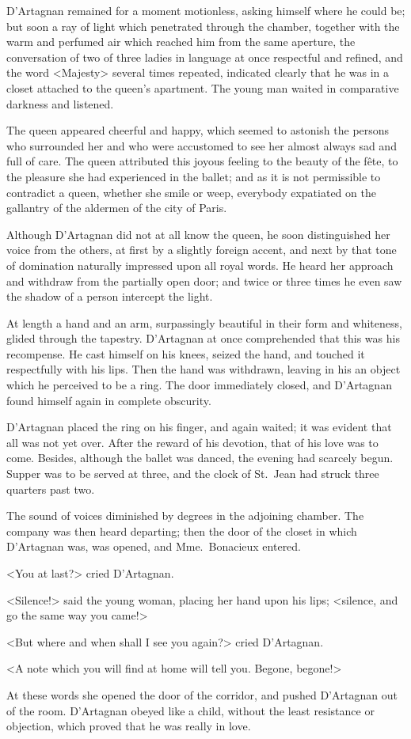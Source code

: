 D'Artagnan remained for a moment motionless, asking himself where he could be; but soon a ray of light which penetrated through the chamber, together with the warm and perfumed air which reached him from the same aperture, the conversation of two of three ladies in language at once respectful and refined, and the word <Majesty> several times repeated, indicated clearly that he was in a closet attached to the queen's apartment. The young man waited in comparative darkness and listened. 

The queen appeared cheerful and happy, which seemed to astonish the persons who surrounded her and who were accustomed to see her almost always sad and full of care. The queen attributed this joyous feeling to the beauty of the fête, to the pleasure she had experienced in the ballet; and as it is not permissible to contradict a queen, whether she smile or weep, everybody expatiated on the gallantry of the aldermen of the city of Paris. 

Although D'Artagnan did not at all know the queen, he soon distinguished her voice from the others, at first by a slightly foreign accent, and next by that tone of domination naturally impressed upon all royal words. He heard her approach and withdraw from the partially open door; and twice or three times he even saw the shadow of a person intercept the light. 

At length a hand and an arm, surpassingly beautiful in their form and whiteness, glided through the tapestry. D'Artagnan at once comprehended that this was his recompense. He cast himself on his knees, seized the hand, and touched it respectfully with his lips. Then the hand was withdrawn, leaving in his an object which he perceived to be a ring. The door immediately closed, and D'Artagnan found himself again in complete obscurity. 

D'Artagnan placed the ring on his finger, and again waited; it was evident that all was not yet over. After the reward of his devotion, that of his love was to come. Besides, although the ballet was danced, the evening had scarcely begun. Supper was to be served at three, and the clock of St.~Jean had struck three quarters past two. 

The sound of voices diminished by degrees in the adjoining chamber. The company was then heard departing; then the door of the closet in which D'Artagnan was, was opened, and Mme.~Bonacieux entered. 

<You at last?> cried D'Artagnan. 

<Silence!> said the young woman, placing her hand upon his lips; <silence, and go the same way you came!> 

<But where and when shall I see you again?> cried D'Artagnan. 

<A note which you will find at home will tell you. Begone, begone!> 

At these words she opened the door of the corridor, and pushed D'Artagnan out of the room. D'Artagnan obeyed like a child, without the least resistance or objection, which proved that he was really in love.